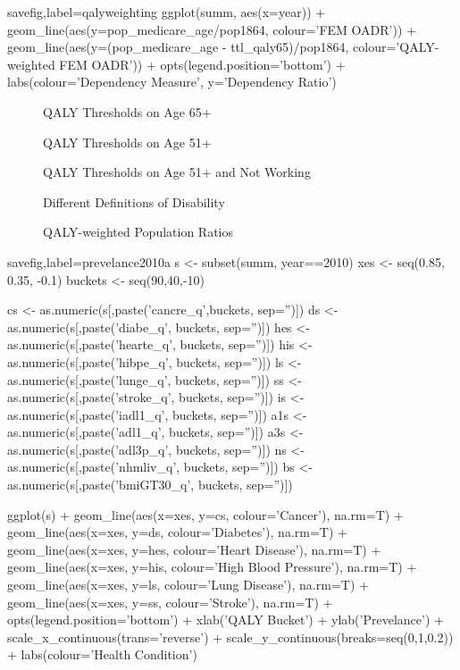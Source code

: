 \documentclass{article}
\begin{document}
\begin{Rcode}{savefig,label=qalyweighting}
ggplot(summ, aes(x=year)) + geom_line(aes(y=pop_medicare_age/pop1864, colour='FEM OADR')) + 
geom_line(aes(y=(pop_medicare_age - ttl_qaly65)/pop1864, colour='QALY-weighted FEM OADR')) + 
opts(legend.position='bottom') + labs(colour='Dependency Measure', y='Dependency Ratio')
\end{Rcode}

\begin{figure}[ht]
\centering
{}
\caption{QALY Thresholds on Age 65+}
\end{figure}

\begin{figure}[ht]
\centering
{}
\caption{QALY Thresholds on Age 51+}
\end{figure}

\begin{figure}[ht]
\centering
{}
\caption{QALY Thresholds on Age 51+ and Not Working}
\end{figure}

\begin{figure}[ht]
\centering
{}
\caption{Different Definitions of Disability}
\end{figure}

\begin{figure}[ht]
\centering
{}
\caption{QALY-weighted Population Ratios}
\end{figure}

\begin{Rcode}{savefig,label=prevelance2010a}
s <- subset(summ, year==2010)
xes <- seq(0.85, 0.35, -0.1)
buckets <- seq(90,40,-10)

cs <- as.numeric(s[,paste('cancre_q',buckets, sep='')])
ds <- as.numeric(s[,paste('diabe_q', buckets, sep='')])
hes <- as.numeric(s[,paste('hearte_q', buckets, sep='')])
his <- as.numeric(s[,paste('hibpe_q', buckets, sep='')])
ls <- as.numeric(s[,paste('lunge_q', buckets, sep='')])
ss <- as.numeric(s[,paste('stroke_q', buckets, sep='')])
is <- as.numeric(s[,paste('iadl1_q', buckets, sep='')])
a1s <- as.numeric(s[,paste('adl1_q', buckets, sep='')])
a3s <- as.numeric(s[,paste('adl3p_q', buckets, sep='')])
ns <- as.numeric(s[,paste('nhmliv_q', buckets, sep='')])
bs <- as.numeric(s[,paste('bmiGT30_q', buckets, sep='')])

ggplot(s) +
geom_line(aes(x=xes, y=cs, colour='Cancer'), na.rm=T) +
geom_line(aes(x=xes, y=ds, colour='Diabetes'), na.rm=T) +
geom_line(aes(x=xes, y=hes, colour='Heart Disease'), na.rm=T) +
geom_line(aes(x=xes, y=his, colour='High Blood Pressure'), na.rm=T) +
geom_line(aes(x=xes, y=ls, colour='Lung Disease'), na.rm=T) +
geom_line(aes(x=xes, y=ss, colour='Stroke'), na.rm=T) +
opts(legend.position='bottom') +
xlab('QALY Bucket') +
ylab('Prevelance') +
scale_x_continuous(trans='reverse') +
scale_y_continuous(breaks=seq(0,1,0.2)) +
labs(colour='Health Condition')
\end{Rcode}
\end{document}
